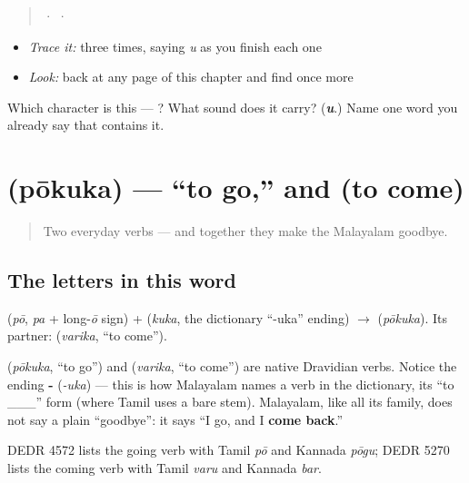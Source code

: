 \begin{quote}
  ·    ·  
\end{quote}

\begin{itemize}
\raggedright
  \item \emph{Trace it:}  three times, saying \emph{u} as you finish each one
  \item \emph{Look:} back at any page of this chapter and find  once more
\end{itemize}

\begin{tcolorbox}[breakable,colback=teal!4,colframe=teal!35!black,title={Before you move on}]
Which character is this — ? What sound does it carry? (\emph{\textbf{u}}.) Name one word you already say that contains it.
\end{tcolorbox}
\section[\texorpdfstring{\ml{പോകുക} (pōkuka)}{പോകുക (pōkuka)}]{ (pōkuka) — \textquotedblleft{}to go,\textquotedblright{} and  (to come)}

\label{lesson:ML-C04-pokuka}



\begin{quote}
Two everyday verbs — and together they make the Malayalam goodbye.
\end{quote}

\subsection*{The letters in this word}
\textbf{} (\emph{pō}, \emph{pa} + long-\emph{ō} sign) + \textbf{} (\emph{kuka}, the dictionary \textquotedblleft{}-uka\textquotedblright{} ending) $\to$ \textbf{} (\emph{pōkuka}). Its partner: \textbf{} (\emph{varika}, \textquotedblleft{}to come\textquotedblright{}).

\begin{cousinweb}
\textbf{} (\emph{pōkuka}, \textquotedblleft{}to go\textquotedblright{}) and \textbf{} (\emph{varika}, \textquotedblleft{}to come\textquotedblright{}) are native Dravidian verbs. Notice the ending \textbf{-} (\emph{-uka}) — this is how Malayalam names a verb in the dictionary, its \textquotedblleft{}to \_\_\_\textquotedblright{} form (where Tamil uses a bare stem). Malayalam, like all its family, does not say a plain \textquotedblleft{}goodbye\textquotedblright{}: it says \textquotedblleft{}I go, and I \textbf{come back}.\textquotedblright{}

DEDR 4572 lists the going verb with Tamil \emph{pō} and Kannada \emph{pōgu}; DEDR 5270 lists the coming verb with Tamil \emph{varu} and Kannada \emph{bar}.
\end{cousinweb}

